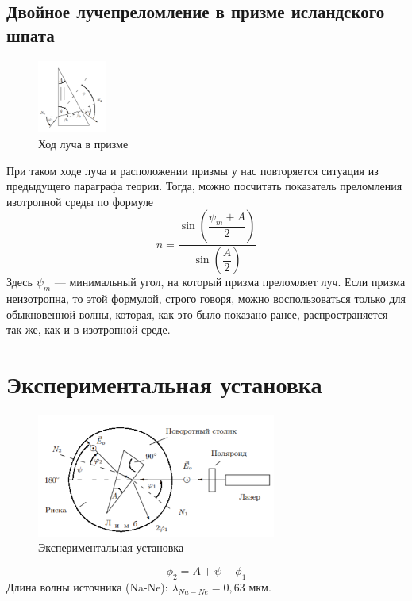 \documentclass[a4paper, 12pt]{article}%
\begin{document}
\subsection*{Двойное лучепреломление в призме исландского шпата}
\begin{figure}
  \begin{center}
    \includegraphics[width = 0.2\textwidth]{1.png}
  \end{center}
  \caption{Ход луча в призме}
\end{figure}
При таком ходе луча и расположении призмы у нас повторяется ситуация из предыдущего параграфа теории. Тогда, можно посчитать показатель преломления изотропной среды по формуле 
\begin{equation}
n = \dfrac{\sin\left(\dfrac{\psi_m + A}{2}\right)}{\sin \left(\dfrac{A}{2}\right)}
\end{equation}
Здесь $\psi_m$  --- минимальный угол, на который призма преломляет луч.
Если призма неизотропна, то этой формулой, строго говоря, можно воспользоваться только для обыкновенной волны, которая, как это было показано ранее, распространяется так же, как и в изотропной среде. 
\section*{Экспериментальная установка}

\begin{figure}[h]
\begin{center}
\includegraphics[width = 0.7\textwidth]{2.png}
\caption{Экспериментальная установка}
\end{center}
\end{figure}
\begin{equation}
\phi_2 = A + \psi - \phi_1
\end{equation}
Длина волны источника (Na-Ne): $\lambda_{Na-Ne} = 0,63$ мкм.
\end{document}
